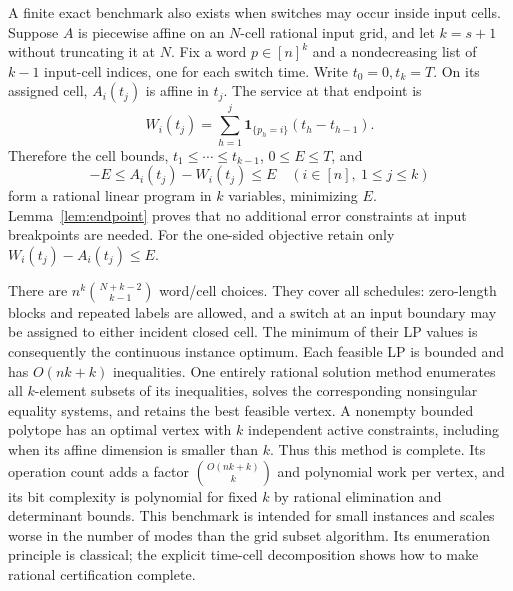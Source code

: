 A finite exact benchmark also exists when switches may occur inside input
cells. Suppose $A$ is piecewise affine on an $N$-cell
rational input grid, and let $k=s+1$ without truncating it at $N$. Fix a word
$p\in[n]^k$ and a nondecreasing list of $k-1$ input-cell indices, one for
each switch time. Write $t_0=0,t_k=T$. On its assigned cell,
$A_i(t_j)$ is affine in $t_j$. The service at that endpoint is
\[
 W_i(t_j)=\sum_{h=1}^j\mathbf1_{\{p_h=i\}}(t_h-t_{h-1}).
\]
Therefore the cell bounds, $t_1\le\cdots\le t_{k-1}$, $0\le E\le T$,
and
\begin{equation}\label{eq:continuous-cell-LP}
 -E\le A_i(t_j)-W_i(t_j)\le E
 \quad(i\in[n],\ 1\le j\le k)
\end{equation}
form a rational linear program in $k$ variables, minimizing $E$.
Lemma~\ref{lem:endpoint} proves that no additional error constraints at
input breakpoints are needed. For the one-sided objective retain only
$W_i(t_j)-A_i(t_j)\le E$.

There are $n^k\binom{N+k-2}{k-1}$ word/cell choices. They cover all schedules:
zero-length blocks and repeated labels are allowed, and a switch at an input
boundary may be assigned to either incident closed cell. The minimum of
their LP values is consequently the continuous instance optimum. Each
feasible LP is bounded and has $O(nk+k)$ inequalities. One entirely rational
solution method enumerates all $k$-element subsets of its inequalities,
solves the corresponding nonsingular equality systems, and retains the best
feasible vertex. A nonempty bounded polytope has an optimal vertex with
$k$ independent active constraints, including when its affine dimension is
smaller than $k$. Thus this method is complete. Its operation count adds a
factor $\binom{O(nk+k)}{k}$ and polynomial work per vertex, and its bit
complexity is polynomial for fixed $k$ by rational elimination and determinant
bounds. This benchmark is intended for small instances and scales worse in
the number of modes than the grid subset algorithm. Its enumeration principle
is classical; the explicit time-cell decomposition shows how to make rational
certification complete.
